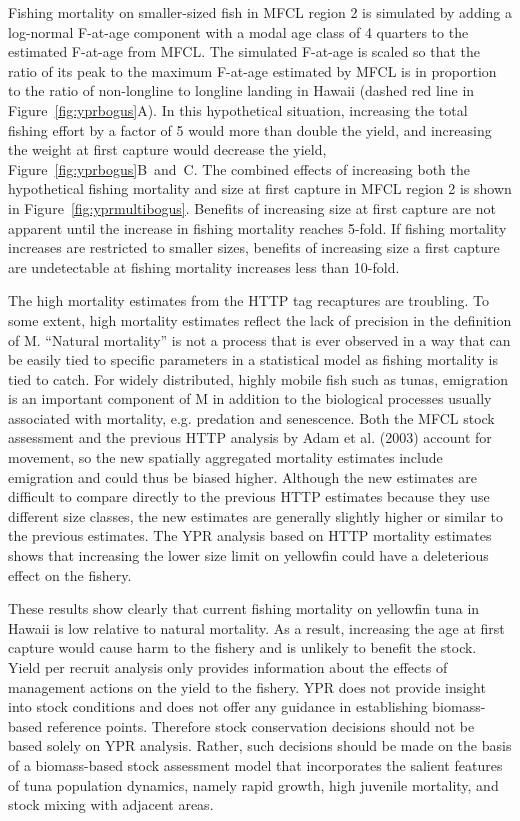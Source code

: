 \documentclass[12pt,letterpaper,twoside]{article}
\begin{document}
Fishing mortality on smaller-sized fish in MFCL region 2 is simulated
by adding a log-normal F-at-age component with a modal age class of 4
quarters to the estimated
F-at-age from MFCL. The simulated F-at-age is scaled so that the
ratio of its peak to the maximum F-at-age estimated by MFCL is in
proportion to the ratio of non-longline to longline landing in Hawaii
(dashed red line in Figure~\ref{fig:yprbogus}A). 
In this hypothetical situation, increasing the total
fishing effort by a factor of 5 would more than double the
yield, and increasing the weight at first capture would decrease the
yield, Figure~\ref{fig:yprbogus}B~and~C. 
The combined effects of increasing both the hypothetical fishing
mortality and size at first capture
in MFCL region 2 is shown in  Figure~\ref{fig:yprmultibogus}.
Benefits of increasing size at first capture are not apparent
until the increase in fishing mortality reaches 5-fold. 
If fishing mortality increases are restricted to
smaller sizes, benefits of increasing size a first capture are
undetectable at fishing mortality increases less than 10-fold.


The high mortality estimates from the HTTP tag recaptures are
troubling. To some extent, high mortality estimates reflect the
lack of precision in the definition of M. ``Natural mortality'' is not
a process that is ever observed in a way that can be easily tied to
specific parameters in a statistical model as fishing mortality is
tied to catch. 
For widely distributed, highly mobile fish such as tunas,
emigration is an important component of M in addition to the
biological processes usually associated with mortality, e.g. predation and
senescence. Both the MFCL stock assessment and the previous HTTP
analysis by Adam et al. (2003) account for movement, so the new
spatially aggregated mortality estimates include emigration and could
thus be biased higher.
Although the new estimates are difficult to compare directly to the
previous HTTP estimates because they use different size
classes, the new estimates are generally slightly higher or similar to
the previous estimates. 
The YPR analysis based on HTTP mortality estimates shows that
increasing the lower size limit on yellowfin could have a deleterious
effect on the fishery.

These results show clearly that current fishing mortality on yellowfin
tuna in Hawaii is low relative to natural mortality. As a result,
increasing the age at first capture would  cause harm to the fishery and
is unlikely to benefit the stock.
Yield per recruit analysis only provides information about the effects
of management actions on the yield to the fishery. YPR does not
provide insight into stock conditions and does not offer any guidance
in establishing biomass-based reference points. Therefore stock conservation
decisions should not be based solely on YPR analysis. Rather, such
decisions should be made on the basis of a biomass-based stock
assessment model that incorporates the salient features of tuna
population dynamics, namely rapid growth, high juvenile mortality,
and stock mixing with adjacent areas.
\end{document}

